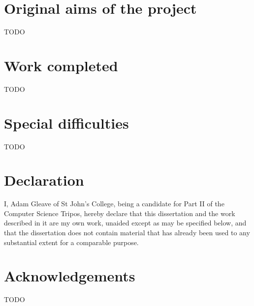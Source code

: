 \documentclass[12pt,a4paper,twoside,notitlepage]{report}
\theoremstyle{definition}
\begin{document}
\section*{Original aims of the project}

TODO

\vspace*{-1em}
\section*{Work completed}

TODO

\vspace*{-1em}
\section*{Special difficulties}

TODO

\newpage

\section*{Declaration}

I, Adam Gleave of St John's College, being a candidate for Part II of the 
Computer Science Tripos, hereby declare that this dissertation and the work 
described in it are my own work, unaided except as may be specified below, and
that the dissertation does not contain material that has already been used to
any substantial extent for a comparable purpose.

\bigskip
{}
\medskip
{}

\clearpage

\tableofcontents

\listoffigures

\newpage
\section*{Acknowledgements}

TODO

\clearpage	%

\setcounter{page}{1}
\pagestyle{headings}



\cleardoublepage


\cleardoublepage

\end{document}
